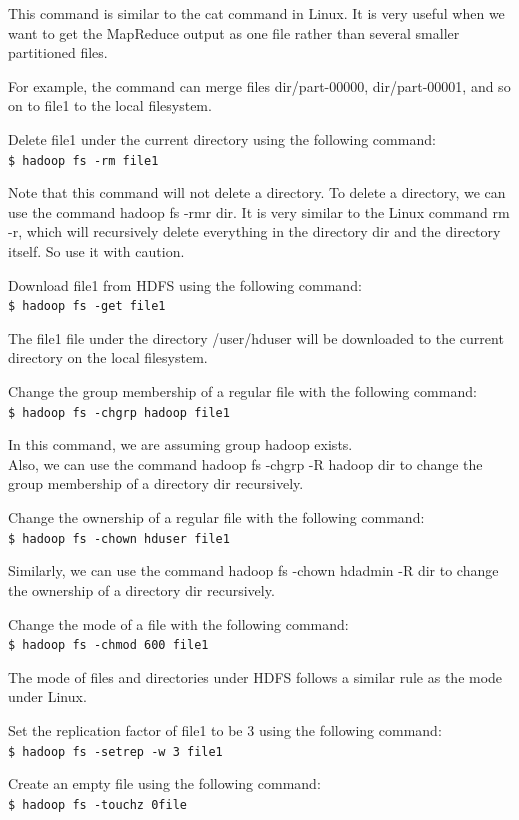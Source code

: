 This command is similar to the cat command in Linux. It is very useful when we want to get the MapReduce output as one file rather than several smaller partitioned files.

For example, the command can merge files dir/part-00000, dir/part-00001, and so on to file1 to the local filesystem.

Delete file1 under the current directory using the following command:\\
\verb|$ hadoop fs -rm file1|

Note that this command will not delete a directory. To delete a directory, we can use the command hadoop fs -rmr dir. It is very similar to the Linux command rm -r, which will recursively delete everything in the directory dir and the directory itself. So use it with caution.

Download file1 from HDFS using the following command: \\
\verb|$ hadoop fs -get file1|

The file1 file under the directory /user/hduser will be downloaded to the current directory on the local filesystem.

Change the group membership of a regular file with the following command: \\
\verb|$ hadoop fs -chgrp hadoop file1|

In this command, we are assuming group hadoop exists. \\
Also, we can use the command hadoop fs -chgrp -R hadoop dir to change the group membership of a directory dir recursively.

Change the ownership of a regular file with the following command: \\
\verb|$ hadoop fs -chown hduser file1|

Similarly, we can use the command hadoop fs -chown hdadmin -R dir to change the ownership of a directory dir recursively.

Change the mode of a file with the following command: \\
\verb|$ hadoop fs -chmod 600 file1|

The mode of files and directories under HDFS follows a similar rule as the mode under Linux.

Set the replication factor of file1 to be 3 using the following command:\\
\verb|$ hadoop fs -setrep -w 3 file1|

Create an empty file using the following command: \\
\verb|$ hadoop fs -touchz 0file|


